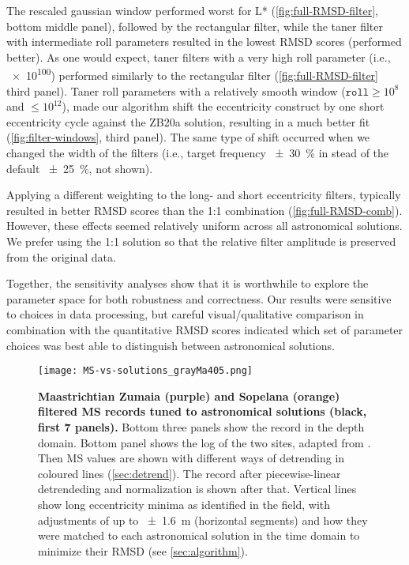 \documentclass[]{agujournal2019}
\begin{document}
The rescaled gaussian window performed worst for \gls{L*} (\cref{fig:full-RMSD-filter}, bottom middle panel),
followed by the rectangular filter,
while the taner filter with intermediate roll parameters resulted in the lowest \gls{RMSD} scores (performed better).
As one would expect, taner filters with a very high roll parameter (i.e., \num{e100}) performed similarly to the rectangular filter (\cref{fig:full-RMSD-filter} third panel).
Taner roll parameters with a relatively smooth window (\(\texttt{roll} \ge 10^{8}\) and \(\le 10^{12}\)), made our algorithm shift the eccentricity construct by one short eccentricity cycle against the ZB20a solution, resulting in a much better fit (\cref{fig:filter-windows}, third panel).
The same type of shift occurred when we changed the width of the filters (i.e., target frequency \qty{\pm30}{\percent} in stead of the default \qty{\pm25}{\percent}, not shown).

Applying a different weighting to the long- and short eccentricity filters, typically resulted in better \gls{RMSD} scores than the 1:1 combination (\cref{fig:full-RMSD-comb}).
However, these effects seemed relatively uniform across all astronomical solutions.
We prefer using the 1:1 solution so that the relative filter amplitude is preserved from the original data.

Together, the sensitivity analyses show that it is worthwhile to explore the parameter space for both robustness and correctness.
Our results were sensitive to choices in data processing, but careful visual/qualitative comparison in combination with the quantitative \gls{RMSD} scores indicated which set of parameter choices was best able to distinguish between astronomical solutions.

\begin{figure}
  \centering
  \texttt{[image: MS-vs-solutions\_grayMa405.png]}
  \caption{\label{fig:rolling-age-MS}
    \textbf{Maastrichtian Zumaia (purple) and Sopelana (orange) filtered \gls{MS} records tuned to astronomical solutions (black, first 7 panels).}
    Bottom three panels show the record in the depth domain.
    Bottom panel shows the log of the two sites, adapted from .
    Then \gls{MS} values are shown with different ways of detrending in coloured lines (\cref{sec:detrend}).
    The record after piecewise-linear detrendeding and normalization is shown after that.
    Vertical lines show long eccentricity minima as identified in the field,
    with adjustments of up to \qty{\pm1.6}{\metre} (horizontal segments)
    and how they were matched to each astronomical solution in the time domain to minimize their \gls{RMSD} (see \cref{sec:algorithm}).
    }
\end{figure}
\end{document}
